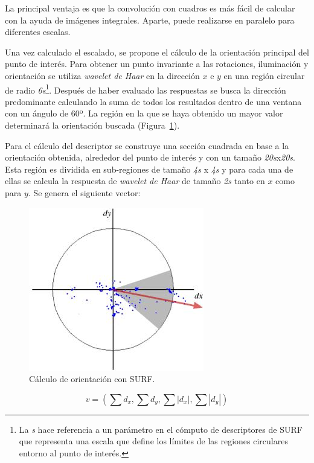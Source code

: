 La principal ventaja es que la convolución con cuadros es más fácil de calcular con la ayuda de imágenes integrales. Aparte, puede realizarse en paralelo para diferentes escalas.

Una vez calculado el escalado, se propone el cálculo de la orientación principal del punto de interés. Para obtener un punto invariante a las rotaciones, iluminación y orientación se utiliza \textit{wavelet de Haar} en la dirección $x$ e $y$ en una región circular de radio \textit{6s}\footnote{La \textit{s} hace referencia a un parámetro en el cómputo de descriptores de SURF que representa una escala que define los límites de las regiones circulares entorno al punto de interés.}. Después de haber evaluado las respuestas se busca la dirección predominante calculando la suma de todos los resultados dentro de una ventana con un ángulo de 60º. La región en la que se haya obtenido un mayor valor determinará la orientación buscada (Figura~\ref{fig:surf2}).

Para el cálculo del descriptor se construye una sección cuadrada en base a la orientación obtenida, alrededor del punto de interés y con un tamaño \textit{20s}x\textit{20s}. Esta región es dividida en sub-regiones de tamaño \textit{4s} x \textit{4s} y para cada una de ellas se calcula la respuesta de \textit{wavelet de Haar} de tamaño \textit{2s} tanto en $x$ como para $y$. Se genera el siguiente vector:

\begin{figure}[ht]
\centering
\includegraphics[scale=0.5]{Figures/surf-2.jpg}
\decoRule
\caption[Cálculo de orientación con SURF]{Cálculo de orientación con SURF.}
\label{fig:surf2}
\end{figure}

\begin{equation}
v=\left(\sum d_{x},\sum d_{y},\sum|d_{x}|,\sum|d_{y}|\right)
\end{equation}

